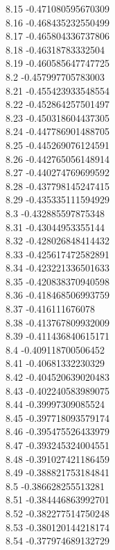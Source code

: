 {8.15	-0.471080595670309\\
8.16	-0.468435232550499\\
8.17	-0.465804336737806\\
8.18	-0.46318783332504\\
8.19	-0.460585647747725\\
8.2	-0.457997705783003\\
8.21	-0.455423933548554\\
8.22	-0.452864257501497\\
8.23	-0.450318604437305\\
8.24	-0.447786901488705\\
8.25	-0.445269076124591\\
8.26	-0.442765056148914\\
8.27	-0.440274769699592\\
8.28	-0.437798145247415\\
8.29	-0.435335111594929\\
8.3	-0.432885597875348\\
8.31	-0.43044953355144\\
8.32	-0.428026848414432\\
8.33	-0.425617472582891\\
8.34	-0.423221336501633\\
8.35	-0.420838370940598\\
8.36	-0.418468506993759\\
8.37	-0.416111676078\\
8.38	-0.413767809932009\\
8.39	-0.411436840615171\\
8.4	-0.409118700506452\\
8.41	-0.40681332230329\\
8.42	-0.404520639020483\\
8.43	-0.402240583989075\\
8.44	-0.39997309085524\\
8.45	-0.397718093579174\\
8.46	-0.395475526433979\\
8.47	-0.393245324004551\\
8.48	-0.391027421186459\\
8.49	-0.388821753184841\\
8.5	-0.386628255513281\\
8.51	-0.384446863992701\\
8.52	-0.382277514750248\\
8.53	-0.380120144218174\\
8.54	-0.377974689132729\\
}
